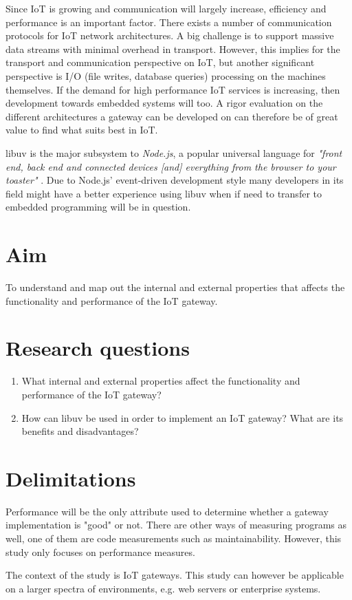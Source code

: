 Since IoT is growing and communication will largely increase, efficiency and
performance is an important factor. There exists a number of communication
protocols for IoT network architectures. A big challenge is to support massive
data streams with minimal overhead in transport. However, this implies for the
transport and communication perspective on IoT, but another significant
perspective is I/O (file writes, database queries) processing on the machines
themselves. If the demand for high performance IoT services is increasing, then
development towards embedded systems will too. A rigor evaluation on the
different architectures a gateway can be developed on can therefore be of great
value to find what suits best in IoT.

libuv is the major subsystem to \textit{Node.js}, a popular universal language
for \textit{"front end, back end and connected devices [and] everything from
the browser to your toaster"} \cite{node-js-survey-report-2016}. Due to
Node.js' event-driven development style many developers in its field might have
a better experience using libuv when if need to transfer to embedded
programming will be in question.

\section{Aim}
\label{sec:aim}

To understand and map out the internal and external properties that affects the
functionality and performance of the IoT gateway.

\section{Research questions}
\label{sec:research-questions}

\begin{enumerate}

    \item What internal and external properties affect the functionality and
        performance of the IoT gateway?

    \item How can libuv be used in order to implement an IoT gateway? What are
        its benefits and disadvantages?

\end{enumerate}

\section{Delimitations}
\label{sec:delimitations}

Performance will be the only attribute used to determine whether a gateway
implementation is "good" or not. There are other ways of measuring programs as
well, one of them are code measurements such as maintainability. However, this
study only focuses on performance measures.

The context of the study is IoT gateways. This study can however be applicable
on a larger spectra of environments, e.g. web servers or enterprise systems.
